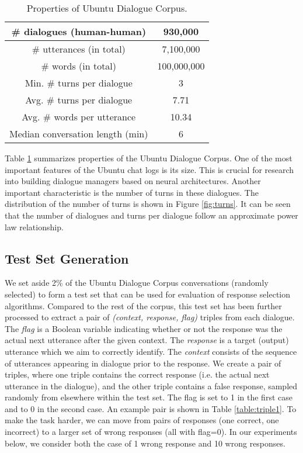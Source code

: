 \documentclass[11pt,a4paper]{article}
\begin{document}
\begin{table}
\small
\centering
\begin{tabular}{|c |c |} \hline
\# dialogues (human-human) & 930,000  \\ \hline 
 \# utterances (in total) & 7,100,000 \\ \hline
 \# words (in total) & 100,000,000 \\ \hline
 Min. \# turns per dialogue & 3 \\ \hline 
 Avg. \# turns per dialogue & 7.71 \\ \hline
 Avg. \# words per utterance & 10.34 \\ \hline
 Median conversation length (min) & 6 \\ \hline
\end{tabular}
\caption{\label{table:dataset_stats}Properties of Ubuntu Dialogue Corpus. }
\end{table}

Table \ref{table:dataset_stats} summarizes properties of the Ubuntu Dialogue Corpus.   One of the most important features of the Ubuntu chat logs is its size. This is crucial for research into building dialogue managers based on neural architectures. Another important characteristic is the number of turns in these dialogues. The distribution of the number of turns is shown in Figure \ref{fig:turns}. It can be seen that the number of dialogues and turns per dialogue follow an approximate power law relationship.





\subsection{Test Set Generation}
\label{sec:testset}


We set aside 2\% of the Ubuntu Dialogue Corpus conversations (randomly selected) to form a test set that can be used for evaluation of response selection algorithms. Compared to the rest of the corpus, this test set has been further processed to extract a pair of \emph{(context, response, flag)} triples from each dialogue. 
The \emph{flag} is a Boolean variable indicating whether or not the response was the actual next utterance after the given context. 
The \emph{response} is a target (output) utterance which we aim to correctly identify.
The \emph{context} consists of the sequence of utterances appearing in dialogue prior to the response.
We create a pair of triples, where one triple contains the correct response (i.e. the actual next utterance in the dialogue), and the other triple contains a false response, sampled randomly from elsewhere within the test set.  The flag is set to 1 in the first case and to 0 in the second case.  An example pair is shown in Table \ref{table:triple1}.  To make the task harder, we can move from pairs of responses (one correct, one incorrect) to a larger set of wrong responses (all with flag=0).  In our experiments below, we consider both the case of 1 wrong response and 10 wrong responses.
\end{document}

